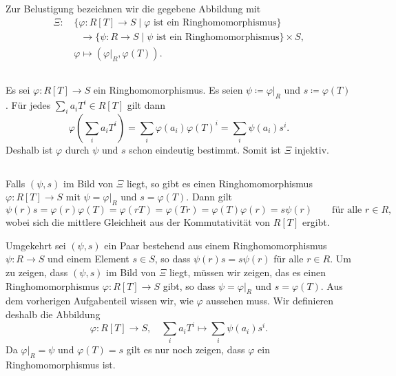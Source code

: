 \documentclass[a4paper, 10pt, numbers=noenddot]{scrartcl}
\begin{document}
\section{}

Zur Belustigung bezeichnen wir die gegebene Abbildung mit
\begin{align*}
              \Xi
  \colon&\,   \{ \varphi  \colon R[T] \to S \mid \text{$\varphi$ ist ein Ringhomomorphismus} \}
  \\
        &\,   \phantom{\varphi} \to \{ \psi \colon R \to S        \mid \text{$\psi$ ist ein Ringhomomorphismus} \}
                                    \times S,
  \\
         &\,  \varphi
  \mapsto     (\varphi|_R, \varphi(T)).
\end{align*}





\subsection{}

Es sei $\varphi \colon R[T] \to S$ ein Ringhomomorphismus.
Es seien $\psi \coloneqq \varphi|_R$ und $s \coloneqq \varphi(T)$.
Für jedes $\sum_i a_i T^i \in R[T]$ gilt dann
\[
    \varphi\left( \sum_i a_i T^i \right)
  = \sum_i \varphi(a_i) \varphi(T)^i
  = \sum_i \psi(a_i) s^i.
\]
Deshalb ist $\varphi$ durch $\psi$ und $s$ schon eindeutig bestimmt.
Somit ist $\Xi$ injektiv.





\subsection{}

Falls $(\psi, s)$ im Bild von $\Xi$ liegt, so gibt es einen Ringhomomorphismus $\varphi \colon R[T] \to S$ mit $\psi = \varphi|_R$ und $s = \varphi(T)$.
Dann gilt
\[
    \psi(r) s
  = \varphi(r) \varphi(T)
  = \varphi(r T)
  = \varphi(T r)
  = \varphi(T) \varphi(r)
  = s \psi(r)
  \qquad
  \text{für alle $r \in R$},
\]
wobei sich die mittlere Gleichheit aus der Kommutativität von $R[T]$ ergibt.

Umgekehrt sei $(\psi, s)$ ein Paar bestehend aus einem Ringhomomorphismus $\psi \colon R \to S$ und einem Element $s \in S$, so dass $\psi(r) s = s \psi(r)$ für alle $r \in R$.
Um zu zeigen, dass $(\psi, s)$ im Bild von $\Xi$ liegt, müssen wir zeigen, das es einen Ringhomomorphismus $\varphi \colon R[T] \to S$ gibt, so dass $\psi = \varphi|_R$ und $s = \varphi(T)$.
Aus dem vorherigen Aufgabenteil wissen wir, wie $\varphi$ aussehen muss.
Wir definieren deshalb die Abbildung
\[
  \varphi \colon R[T] \to S,
  \quad
  \sum_i a_i T^i \mapsto \sum_i \psi(a_i) s^i.
\]
Da $\varphi|_R = \psi$ und $\varphi(T) = s$ gilt es nur noch zeigen, dass $\varphi$ ein Ringhomomorphismus ist.
\end{document}
